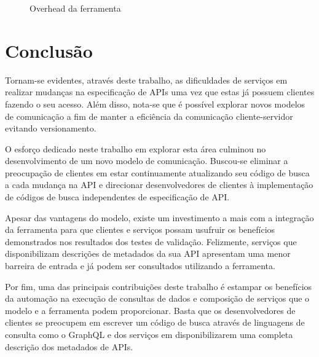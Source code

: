 \documentclass[12pt]{article}
\begin{document}
  \begin{figure}[H]
    \centering
    \caption{Overhead da ferramenta}
  \end{figure}

  \section{Conclusão}\label{sec:figs}

  Tornam-se evidentes, através deste trabalho, as dificuldades de serviços em realizar mudanças na especificação de APIs uma vez que estas já possuem clientes fazendo o seu acesso. Além disso, nota-se que é possível explorar novos modelos de comunicação a fim de manter a eficiência da comunicação cliente-servidor evitando versionamento.

  O esforço dedicado neste trabalho em explorar esta área culminou no desenvolvimento de um novo modelo de comunicação. Buscou-se eliminar a preocupação de clientes em estar continuamente atualizando seu código de busca a cada mudança na API e direcionar desenvolvedores de clientes à implementação de códigos de busca independentes de especificação de API.

  Apesar das vantagens do modelo, existe um investimento a mais com a integração da ferramenta para que clientes e serviços possam usufruir os benefícios demonstrados nos resultados dos testes de validação. Felizmente, serviços que disponibilizam descrições de metadados da sua API apresentam uma menor barreira de entrada e já podem ser consultados utilizando a ferramenta.

  Por fim, uma das principais contribuições deste trabalho é estampar os benefícios da automação na execução de consultas de dados e composição de serviços que o modelo e a ferramenta podem proporcionar. Basta que os desenvolvedores de clientes se preocupem em escrever um código de busca através de linguagens de consulta como o GraphQL e dos serviços em disponibilizarem uma completa descrição dos metadados de APIs.
  
  
  
\end{document}

